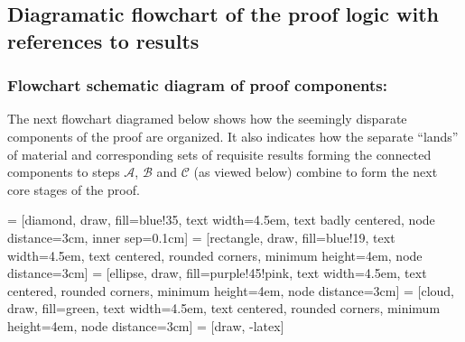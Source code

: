 \documentclass[11pt,reqno,a4letter]{article}
\numberwithin{figure}{section}
\numberwithin{table}{section}
\theoremstyle{plain}
\numberwithin{theorem}{section}
\theoremstyle{definition}
\begin{document}
\begin{itemize}
\end{itemize} 

\subsection{Diagramatic flowchart of the proof logic with references to results} 

\subsubsection*{Flowchart schematic diagram of proof components: } 

The next flowchart diagramed below shows how the seemingly disparate components of the proof are organized. 
It also indicates how the separate ``lands'' of material and corresponding sets of requisite results 
forming the connected components to steps $\mathcal{A}$, $\mathcal{B}$ and $\mathcal{C}$ (as viewed below) 
combine to form the next core stages of the proof. 

 = [diamond, draw, fill=blue!35, text width=4.5em, text badly centered, 
                             node distance=3cm, inner sep=0.1cm]
 = [rectangle, draw, fill=blue!19, text width=4.5em, text centered, 
                            rounded corners, minimum height=4em, node distance=3cm]
 = [ellipse, draw, fill=purple!45!pink, text width=4.5em, text centered, 
                            rounded corners, minimum height=4em, node distance=3cm]
 = [cloud, draw, fill=green, text width=4.5em, text centered, 
                            rounded corners, minimum height=4em, node distance=3cm]
 = [draw, -latex]

\begin{center}
\end{center}
\end{document}
